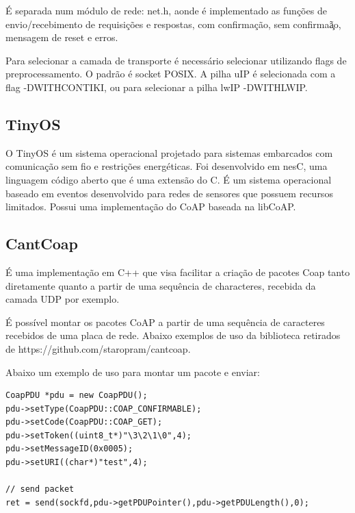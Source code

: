\'E separada num m\'odulo de rede: net.h, aonde \'e implementado as fun\c{c}\~oes de envio/recebimento de requisi\c{c}\~oes e respostas, com confirma\c{c}\~ao, sem confirma\c\~ao, mensagem de reset e erros.

Para selecionar a camada de transporte \'e necess\'ario selecionar utilizando flags de preprocessamento. O padr\~ao \'e socket POSIX. A pilha uIP \'e selecionada com a flag -DWITH\textunderscore CONTIKI, ou para selecionar a pilha lwIP -DWITH\textunderscore LWIP.

\subsection{TinyOS}
O TinyOS \'e um sistema operacional projetado para sistemas embarcados com comunica\c{c}\~ao sem fio e restri\c{c}\~oes energ\'eticas. Foi desenvolvido em nesC, uma linguagem c\'odigo aberto que \'e uma extens\~ao do C. \'E um sistema operacional baseado em eventos desenvolvido para redes de sensores que possuem recursos limitados. Possui uma implementa\c{c}\~ao do CoAP baseada na libCoAP.

\subsection{CantCoap}
\'E uma implementa\c{c}\~ao em C++ que visa facilitar a cria\c{c}\~ao de pacotes Coap tanto diretamente quanto a partir de uma sequ\^encia de characteres, recebida da camada UDP por exemplo.

\'E poss\'ivel montar os pacotes CoAP a partir de uma sequ\^encia de caracteres recebidos de uma placa de rede. Abaixo exemplos de uso da biblioteca retirados de https://github.com/staropram/cantcoap.


\lstset{escapechar=@,style=customc}

Abaixo um exemplo de uso para montar um pacote e enviar:

\begin{lstlisting}
CoapPDU *pdu = new CoapPDU();
pdu->setType(CoapPDU::COAP_CONFIRMABLE);
pdu->setCode(CoapPDU::COAP_GET);
pdu->setToken((uint8_t*)"\3\2\1\0",4);
pdu->setMessageID(0x0005);
pdu->setURI((char*)"test",4);

// send packet 
ret = send(sockfd,pdu->getPDUPointer(),pdu->getPDULength(),0);
\end{lstlisting}


